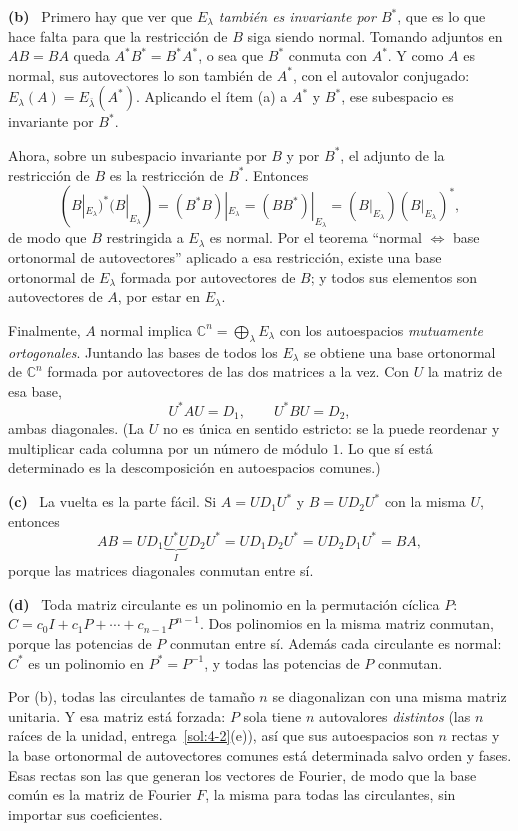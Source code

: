 \documentclass[11pt,a4paper]{article}
\newcommand{\Cx}{\mathbb{C}}
\newcounter{entrega}[section]
\newcommand{\itemsol}[1]{\par\medskip\noindent\textbf{(#1)}\ \ignorespaces}
\begin{document}
\itemsol{b} Primero hay que ver que \emph{$E_\lambda$ también es invariante por
$B^{*}$}, que es lo que hace falta para que la restricción de $B$ siga siendo
normal. Tomando adjuntos en $AB=BA$ queda $A^{*}B^{*}=B^{*}A^{*}$, o sea que
$B^{*}$ conmuta con $A^{*}$. Y como $A$ es normal, sus autovectores lo son
también de $A^{*}$, con el autovalor conjugado:
$E_\lambda(A)=E_{\overline\lambda}(A^{*})$. Aplicando el ítem (a) a $A^{*}$ y
$B^{*}$, ese subespacio es invariante por $B^{*}$.

Ahora, sobre un subespacio invariante por $B$ y por $B^{*}$, el adjunto de la
restricción de $B$ es la restricción de $B^{*}$. Entonces
\[
(B|_{E_\lambda})^{*}(B|_{E_\lambda})=(B^{*}B)|_{E_\lambda}
=(BB^{*})|_{E_\lambda}=(B|_{E_\lambda})(B|_{E_\lambda})^{*},
\]
de modo que $B$ restringida a $E_\lambda$ es normal. Por el teorema
``normal $\iff$ base ortonormal de autovectores'' aplicado a esa restricción,
existe una base ortonormal de $E_\lambda$ formada por autovectores de $B$; y
todos sus elementos son autovectores de $A$, por estar en $E_\lambda$.

Finalmente, $A$ normal implica $\Cx^n=\bigoplus_\lambda E_\lambda$ con los
autoespacios \emph{mutuamente ortogonales}. Juntando las bases de todos los
$E_\lambda$ se obtiene una base ortonormal de $\Cx^n$ formada por autovectores de
las dos matrices a la vez. Con $U$ la matriz de esa base,
\[
U^{*}AU=D_1,\qquad U^{*}BU=D_2 ,
\]
ambas diagonales. (La $U$ no es única en sentido estricto: se la puede reordenar
y multiplicar cada columna por un número de módulo $1$. Lo que sí está
determinado es la descomposición en autoespacios comunes.)

\itemsol{c} La vuelta es la parte fácil. Si $A=UD_1U^{*}$ y $B=UD_2U^{*}$ con la
misma $U$, entonces
\[
AB=UD_1\underbrace{U^{*}U}_{I}D_2U^{*}=UD_1D_2U^{*}=UD_2D_1U^{*}=BA ,
\]
porque las matrices diagonales conmutan entre sí.

\itemsol{d} Toda matriz circulante es un polinomio en la permutación cíclica
$P$: $C=c_0I+c_1P+\cdots+c_{n-1}P^{n-1}$. Dos polinomios en la misma matriz
conmutan, porque las potencias de $P$ conmutan entre sí. Además cada circulante
es normal: $C^{*}$ es un polinomio en $P^{*}=P^{-1}$, y todas las potencias de
$P$ conmutan.

Por (b), todas las circulantes de tamaño $n$ se diagonalizan con una misma
matriz unitaria. Y esa matriz está forzada: $P$ sola tiene $n$ autovalores
\emph{distintos} (las $n$ raíces de la unidad, entrega~\ref{sol:4-2}(e)), así que
sus autoespacios son $n$ rectas y la base ortonormal de autovectores comunes está
determinada salvo orden y fases. Esas rectas son las que generan los vectores de
Fourier, de modo que la base común es la matriz de Fourier $F$, la misma para
todas las circulantes, sin importar sus coeficientes.
\end{document}
